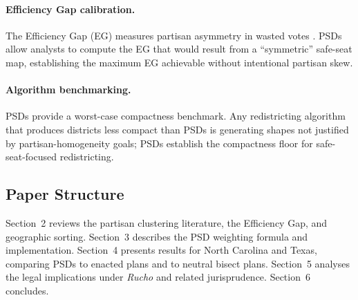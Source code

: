 \paragraph{Efficiency Gap calibration.}
The Efficiency Gap (EG) measures partisan asymmetry in wasted votes
\citep{stephanopoulos2015partisan}.  PSDs allow analysts to compute the EG
that would result from a ``symmetric'' safe-seat map, establishing the
maximum EG achievable without intentional partisan skew.

\paragraph{Algorithm benchmarking.}
PSDs provide a worst-case compactness benchmark.  Any redistricting algorithm
that produces districts less compact than PSDs is generating shapes not
justified by partisan-homogeneity goals; PSDs establish the compactness floor
for safe-seat-focused redistricting.

\subsection{Paper Structure}

Section~2 reviews the partisan clustering literature, the Efficiency Gap, and
geographic sorting.  Section~3 describes the PSD weighting formula and
implementation.  Section~4 presents results for North Carolina and Texas,
comparing PSDs to enacted plans and to neutral bisect plans.  Section~5
analyses the legal implications under \emph{Rucho} and related jurisprudence.
Section~6 concludes.

